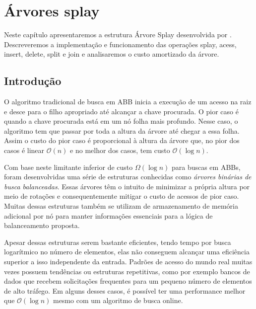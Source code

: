
\chapter{Árvores splay}
\label{cap:arvores-splay}

Neste capítulo apresentaremos a estrutura Árvore Splay desenvolvida por \cite{selfadjustingbst}. Descreveremos a implementação e funcionamento das operações splay, acess, insert, delete, split e join e analisaremos o custo amortizado da árvore.


\section{Introdução}
O algoritmo tradicional de busca em ABB inicia a execução de um acesso na raiz e desce para o filho apropriado até alcançar a chave procurada. O pior caso é quando a chave procurada está em um nó folha mais profundo. Nesse caso, o algoritmo tem que passar por toda a altura da árvore até chegar a essa folha. Assim o custo do pior caso é proporcional à altura da árvore que, no pior dos casos é linear $\mathcal{O}(n)$ e no melhor dos casos, tem custo $\mathcal{O}(\log{}n)$.

Com base neste limitante inferior de custo $\Omega(\log{}n)$ para buscas em ABBs, foram desenvolvidas uma série de estruturas conhecidas como \textit{árvores binárias de busca balanceadas}. Essas árvores têm o intuito de minimizar a própria altura por meio de rotações e consequentemente mitigar o custo de acessos de pior caso. Muitas dessas estruturas também se utilizam de armazenamento de memória adicional por nó para manter informações essenciais para a lógica de balanceamento proposta. 

Apesar dessas estruturas serem bastante eficientes, tendo tempo por busca logarítmico no número de elementos, elas não conseguem alcançar uma eficiência superior a isso independente da entrada. Padrões de acesso do mundo real muitas vezes possuem tendências ou estruturas repetitivas, como por exemplo bancos de dados que recebem solicitações frequentes para um pequeno número de elementos de alto tráfego. Em alguns desses casos, é possível ter uma performance melhor que $\mathcal{O}(\log{}n)$ mesmo com um algoritmo de busca online.

